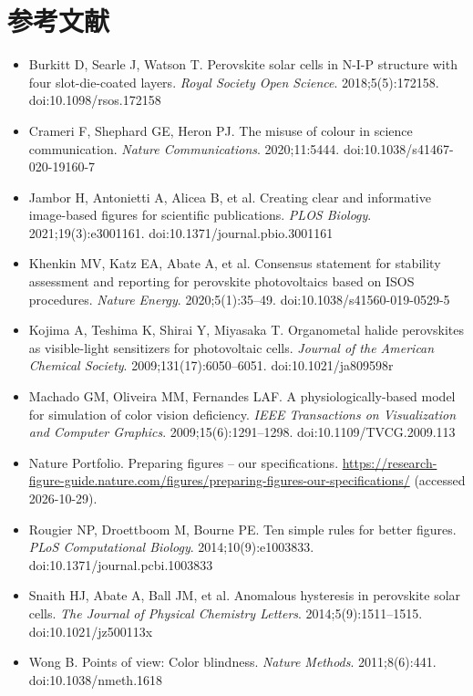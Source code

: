 \section*{参考文献}

\begin{itemize}
\item Burkitt D, Searle J, Watson T. Perovskite solar cells in N-I-P structure with four slot-die-coated layers. \textit{Royal Society Open Science}. 2018;5(5):172158. doi:10.1098/rsos.172158
\item Crameri F, Shephard GE, Heron PJ. The misuse of colour in science communication. \textit{Nature Communications}. 2020;11:5444. doi:10.1038/s41467-020-19160-7
\item Jambor H, Antonietti A, Alicea B, et al. Creating clear and informative image-based figures for scientific publications. \textit{PLOS Biology}. 2021;19(3):e3001161. doi:10.1371/journal.pbio.3001161
\item Khenkin MV, Katz EA, Abate A, et al. Consensus statement for stability assessment and reporting for perovskite photovoltaics based on ISOS procedures. \textit{Nature Energy}. 2020;5(1):35--49. doi:10.1038/s41560-019-0529-5
\item Kojima A, Teshima K, Shirai Y, Miyasaka T. Organometal halide perovskites as visible-light sensitizers for photovoltaic cells. \textit{Journal of the American Chemical Society}. 2009;131(17):6050--6051. doi:10.1021/ja809598r
\item Machado GM, Oliveira MM, Fernandes LAF. A physiologically-based model for simulation of color vision deficiency. \textit{IEEE Transactions on Visualization and Computer Graphics}. 2009;15(6):1291--1298. doi:10.1109/TVCG.2009.113
\item Nature Portfolio. Preparing figures -- our specifications. \url{https://research-figure-guide.nature.com/figures/preparing-figures-our-specifications/} (accessed 2026-10-29).
\item Rougier NP, Droettboom M, Bourne PE. Ten simple rules for better figures. \textit{PLoS Computational Biology}. 2014;10(9):e1003833. doi:10.1371/journal.pcbi.1003833
\item Snaith HJ, Abate A, Ball JM, et al. Anomalous hysteresis in perovskite solar cells. \textit{The Journal of Physical Chemistry Letters}. 2014;5(9):1511--1515. doi:10.1021/jz500113x
\item Wong B. Points of view: Color blindness. \textit{Nature Methods}. 2011;8(6):441. doi:10.1038/nmeth.1618
\end{itemize}

